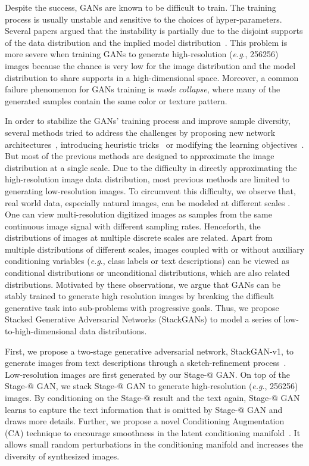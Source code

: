 \documentclass[10pt,journal,letterpaper,compsoc]{IEEEtran}
\makeatletter
\newcommand{\Rmnum}[1]{\expandafter\@slowromancap\romannumeral #1@}
\makeatother
\begin{document}
{
Despite the success, GANs are known to be difficult to train. The training process is usually unstable and sensitive to the choices of hyper-parameters. Several papers argued that the instability is partially due to the disjoint supports of the data distribution and the implied model distribution~\cite{Casper2016, ArjovskyB17}. This problem is more severe when training GANs to generate high-resolution (\emph{e.g}., 256256) images because the chance is very low for the image distribution and the model distribution to share supports in a high-dimensional space. Moreover, a common failure phenomenon for GANs training is \emph{mode collapse}, where many of the generated samples contain the same color or texture pattern. 
}


{
In order to stabilize the GANs' training process and improve sample diversity, several methods tried to address the challenges by proposing new network architectures~\cite{Radford15}, introducing heuristic tricks~\cite{Salimans2016} or modifying the learning objectives~\cite{Martin17WGAN,CheLJBL16,Salimans18}. But most of the previous methods are designed to approximate the image distribution at a single scale. Due to the difficulty in directly approximating the high-resolution image data distribution, most previous methods are limited to generating low-resolution images. To circumvent this difficulty, we observe that, real world data, especially natural images, can be modeled at different scales \cite{ruderman1994statistics}. One can view multi-resolution digitized images as samples from the same continuous image signal with different sampling rates. Henceforth, the distributions of images at multiple discrete scales are related. Apart from multiple distributions of different scales, images coupled with or without auxiliary conditioning variables (\emph{e.g}., class labels or text descriptions) can be viewed as conditional distributions or unconditional distributions, which are also related distributions. Motivated by these observations, we argue that GANs can be stably trained to generate high resolution images by breaking the difficult generative task into sub-problems with progressive goals. Thus, we propose Stacked Generative Adversarial Networks (StackGANs) to model a series of low-to-high-dimensional data distributions. 
}


{
First,  we  propose  a two-stage generative adversarial network, StackGAN-v1, to generate images from text descriptions through a sketch-refinement process~\cite{Han16}. Low-resolution images are first generated by our Stage-\Rmnum{1} GAN. On top of the Stage-\Rmnum{1} GAN, we stack Stage-\Rmnum{2} GAN to generate high-resolution (\emph{e.g}., 256256) images. By conditioning on the Stage-\Rmnum{1} result and the text again, Stage-\Rmnum{2} GAN learns to capture the text information that is omitted by Stage-\Rmnum{1} GAN and draws more details. Further, we propose a novel Conditioning Augmentation (CA) technique to encourage smoothness in the latent conditioning manifold~\cite{Han16}. It allows small random perturbations in the conditioning manifold and increases the diversity of synthesized images. 
}
\end{document}
